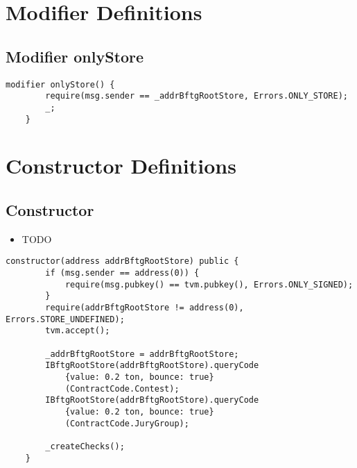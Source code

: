 \section{Modifier Definitions}


\subsection{Modifier onlyStore}


\begin{lstlisting}[firstnumber=29]
    modifier onlyStore() {
        require(msg.sender == _addrBftgRootStore, Errors.ONLY_STORE);
        _;
    }
\end{lstlisting}

\section{Constructor Definitions}


\subsection{Constructor}

\begin{itemize}
\item TODO
\end{itemize}

\begin{lstlisting}[firstnumber=36]
    constructor(address addrBftgRootStore) public {
        if (msg.sender == address(0)) {
            require(msg.pubkey() == tvm.pubkey(), Errors.ONLY_SIGNED);
        }
        require(addrBftgRootStore != address(0), Errors.STORE_UNDEFINED);
        tvm.accept();

        _addrBftgRootStore = addrBftgRootStore;
        IBftgRootStore(addrBftgRootStore).queryCode
            {value: 0.2 ton, bounce: true}
            (ContractCode.Contest);
        IBftgRootStore(addrBftgRootStore).queryCode
            {value: 0.2 ton, bounce: true}
            (ContractCode.JuryGroup);

        _createChecks();
    }
\end{lstlisting}

